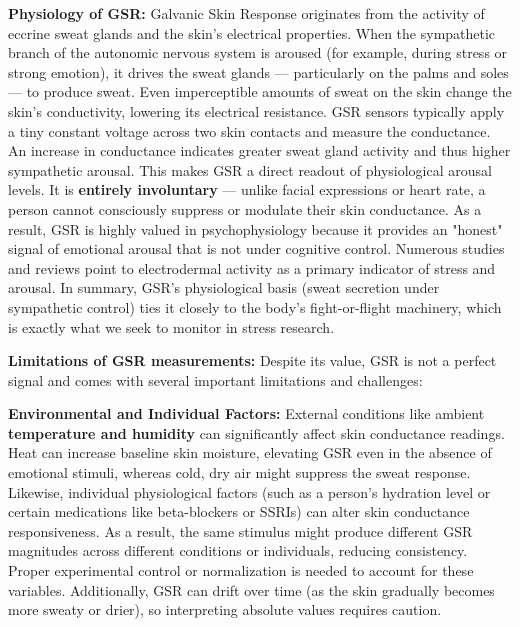 \documentclass[11pt,a4paper]{report}
\begin{document}
\textbf{Physiology of GSR:} Galvanic Skin Response originates from the activity of eccrine sweat glands and the skin's electrical properties. When the sympathetic branch of the autonomic nervous system is aroused (for example, during stress or strong emotion), it drives the sweat glands — particularly on the palms and soles — to produce sweat\cite{ElectrodermalActivityWiki}. Even imperceptible amounts of sweat on the skin change the skin's conductivity, lowering its electrical resistance. GSR sensors typically apply a tiny constant voltage across two skin contacts and measure the conductance. An increase in conductance indicates greater sweat gland activity and thus higher sympathetic arousal\cite{GSRGuideIMotions}. This makes GSR a direct readout of physiological arousal levels. It is \textbf{entirely involuntary} — unlike facial expressions or heart rate, a person cannot consciously suppress or modulate their skin conductance. As a result, GSR is highly valued in psychophysiology because it provides an "honest" signal of emotional arousal that is not under cognitive control. Numerous studies and reviews point to electrodermal activity as a primary indicator of stress and arousal\cite{GSRPPGMachineLearning2024}. In summary, GSR's physiological basis (sweat secretion under sympathetic control) ties it closely to the body's fight-or-flight machinery, which is exactly what we seek to monitor in stress research.

\textbf{Limitations of GSR measurements:} Despite its value, GSR is not a perfect signal and comes with several important limitations and challenges\cite{ElectrodermalActivityWiki}:

\textbf{Environmental and Individual Factors:} External conditions like ambient \textbf{temperature and humidity} can significantly affect skin conductance readings\cite{ElectrodermalActivityWiki}. Heat can increase baseline skin moisture, elevating GSR even in the absence of emotional stimuli, whereas cold, dry air might suppress the sweat response. Likewise, individual physiological factors (such as a person's hydration level or certain medications like beta-blockers or SSRIs) can alter skin conductance responsiveness\cite{ElectrodermalActivityWiki}. As a result, the same stimulus might produce different GSR magnitudes across different conditions or individuals, reducing consistency. Proper experimental control or normalization is needed to account for these variables. Additionally, GSR can drift over time (as the skin gradually becomes more sweaty or drier), so interpreting absolute values requires caution.
\end{document}
